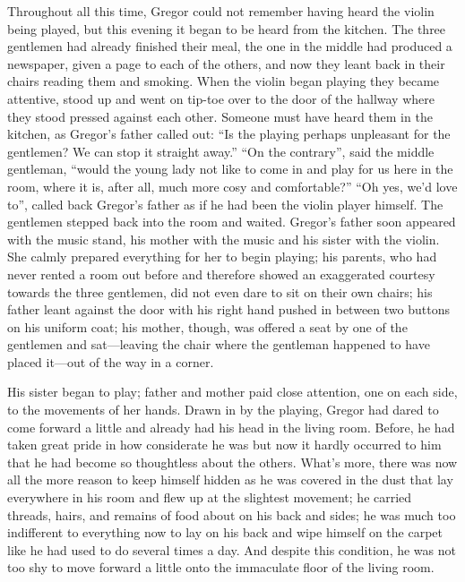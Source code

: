 Throughout all this time, Gregor could not remember having heard the
violin being played, but this evening it began to be heard from the
kitchen. The three gentlemen had already finished their meal, the one
in the middle had produced a newspaper, given a page to each of the
others, and now they leant back in their chairs reading them and
smoking. When the violin began playing they became attentive, stood up
and went on tip-toe over to the door of the hallway where they stood
pressed against each other. Someone must have heard them in the
kitchen, as Gregor’s father called out: “Is the playing perhaps
unpleasant for the gentlemen? We can stop it straight away.” “On the
contrary”, said the middle gentleman, “would the young lady not like to
come in and play for us here in the room, where it is, after all, much
more cosy and comfortable?” “Oh yes, we’d love to”, called back
Gregor’s father as if he had been the violin player himself. The
gentlemen stepped back into the room and waited. Gregor’s father soon
appeared with the music stand, his mother with the music and his sister
with the violin. She calmly prepared everything for her to begin
playing; his parents, who had never rented a room out before and
therefore showed an exaggerated courtesy towards the three gentlemen,
did not even dare to sit on their own chairs; his father leant against
the door with his right hand pushed in between two buttons on his
uniform coat; his mother, though, was offered a seat by one of the
gentlemen and sat—leaving the chair where the gentleman happened to
have placed it—out of the way in a corner.

His sister began to play; father and mother paid close attention, one
on each side, to the movements of her hands. Drawn in by the playing,
Gregor had dared to come forward a little and already had his head in
the living room. Before, he had taken great pride in how considerate he
was but now it hardly occurred to him that he had become so thoughtless
about the others. What’s more, there was now all the more reason to
keep himself hidden as he was covered in the dust that lay everywhere
in his room and flew up at the slightest movement; he carried threads,
hairs, and remains of food about on his back and sides; he was much too
indifferent to everything now to lay on his back and wipe himself on
the carpet like he had used to do several times a day. And despite this
condition, he was not too shy to move forward a little onto the
immaculate floor of the living room.

